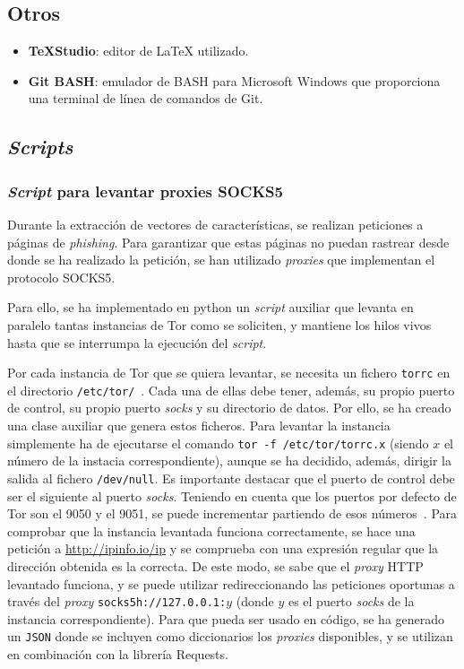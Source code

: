 \subsection{Otros}

\begin{itemize}
	\item \textbf{\TeX{}Studio}: editor de \LaTeX{} utilizado.
	\item \textbf{Git BASH}: emulador de BASH para Microsoft Windows que proporciona una terminal de línea de comandos de Git.
\end{itemize}

\subsection{\textit{Scripts}} 
\subsubsection{\textit{Script} para levantar proxies SOCKS5}

Durante la extracción de vectores de características, se realizan peticiones a páginas de \textit{phishing}. Para garantizar que estas páginas no puedan rastrear desde donde se ha realizado la petición, se han utilizado \textit{proxies} que implementan el protocolo SOCKS5.

Para ello, se ha implementado en python un \textit{script} auxiliar que levanta en paralelo tantas instancias de Tor como se soliciten, y mantiene los hilos vivos hasta que se interrumpa la ejecución del \textit{script}.

Por cada instancia de Tor que se quiera levantar, se necesita un fichero \texttt{torrc} en el directorio \texttt{/etc/tor/}~\cite{TorFicherosTor}. Cada una de ellas debe tener, además, su propio puerto de control, su propio puerto \textit{socks} y su directorio de datos. Por ello, se ha creado una clase auxiliar que genera estos ficheros. Para levantar la instancia simplemente ha de ejecutarse el comando \texttt{tor -f /etc/tor/torrc.x} (siendo $x$ el número de la instacia correspondiente), aunque se ha decidido, además, dirigir la salida al fichero \texttt{/dev/null}. Es importante destacar que el puerto de control debe ser el siguiente al puerto \textit{socks}. Teniendo en cuenta que los puertos por defecto de Tor son el 9050 y el 9051, se puede incrementar partiendo de esos números~\cite{TorficheroComando}. Para comprobar que la instancia levantada funciona correctamente, se hace una petición a \url{http://ipinfo.io/ip} y se comprueba con una expresión regular que la dirección obtenida es la correcta. De este modo, se sabe que el \textit{proxy} HTTP levantado funciona, y se puede utilizar redireccionando las peticiones oportunas a través del \textit{proxy} \texttt{socks5h://127.0.0.1:$y$} (donde $y$ es el puerto \textit{socks} de la instancia correspondiente). Para que pueda ser usado en código, se ha generado un \texttt{JSON} donde se incluyen como diccionarios los \textit{proxies} disponibles, y se utilizan en combinación con la librería Requests.

